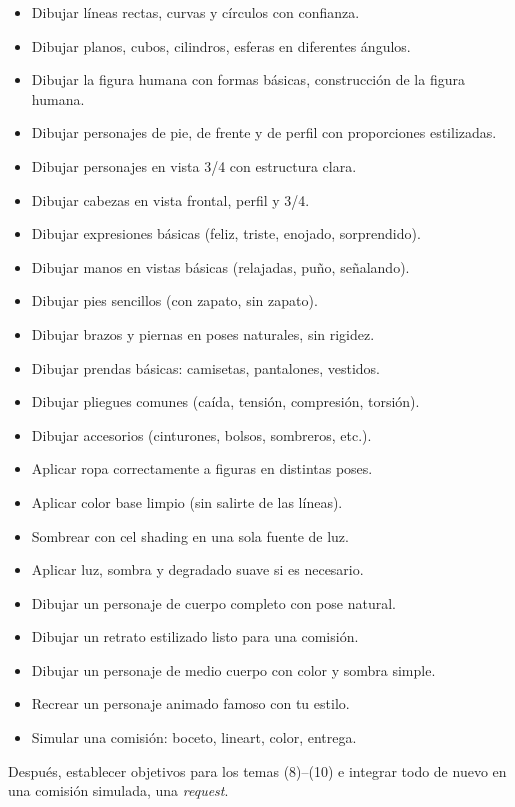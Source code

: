 \begin{itemize}
\item Dibujar líneas rectas, curvas y círculos con confianza. 
\item Dibujar planos, cubos, cilindros, esferas en diferentes ángulos. 
\item Dibujar la figura humana con formas básicas, construcción de la figura humana.
\item Dibujar personajes de pie, de frente y de perfil con proporciones estilizadas. 
\item Dibujar personajes en vista 3/4 con estructura clara. 
\item Dibujar cabezas en vista frontal, perfil y 3/4. 
\item Dibujar expresiones básicas (feliz, triste, enojado, sorprendido).
\item Dibujar manos en vistas básicas (relajadas, puño, señalando).
\item Dibujar pies sencillos (con zapato, sin zapato). 
\item Dibujar brazos y piernas en poses naturales, sin rigidez. 
\item Dibujar prendas básicas: camisetas, pantalones, vestidos. 
\item Dibujar pliegues comunes (caída, tensión, compresión, torsión). 
\item Dibujar accesorios (cinturones, bolsos, sombreros, etc.). 
\item Aplicar ropa correctamente a figuras en distintas poses.
\item Aplicar color base limpio (sin salirte de las líneas).
\item Sombrear con cel shading en una sola fuente de luz. 
\item Aplicar luz, sombra y degradado suave si es necesario.
\item Dibujar un personaje de cuerpo completo con pose natural. 
\item Dibujar un retrato estilizado listo para una comisión. 
\item Dibujar un personaje de medio cuerpo con color y sombra simple. 
\item Recrear un personaje animado famoso con tu estilo. 
\item Simular una comisión: boceto, lineart, color, entrega.
\end{itemize}

Después, establecer objetivos para los temas (8)--(10) e integrar todo de nuevo en una comisión simulada, una \textit{request}.
